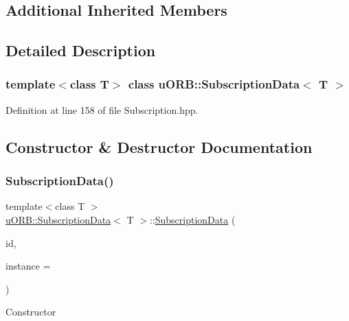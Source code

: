 \subsection*{Additional Inherited Members}


\subsection{Detailed Description}
\subsubsection*{template$<$class T$>$\newline
class u\+O\+R\+B\+::\+Subscription\+Data$<$ T $>$}



Definition at line 158 of file Subscription.\+hpp.



\subsection{Constructor \& Destructor Documentation}
\mbox{\label{classuORB_1_1SubscriptionData_a7d302ca4502cbd67dee434bcbec2d819}} 
\subsubsection{\texorpdfstring{Subscription\+Data()}{SubscriptionData()}\hspace{0.1cm}{\footnotesize\ttfamily [1/2]}}
{\footnotesize\ttfamily template$<$class T $>$ \\
\hyperlink{classuORB_1_1SubscriptionData}{u\+O\+R\+B\+::\+Subscription\+Data}$<$ T $>$\+::\hyperlink{classuORB_1_1SubscriptionData}{Subscription\+Data} (\begin{DoxyParamCaption}\item[{\hyperlink{uORB_8h_a96af5434ec1acdf24287bd7851b0413f}{O\+R\+B\+\_\+\+ID}}]{id,  }\item[{uint8\+\_\+t}]{instance = {} }\end{DoxyParamCaption})\hspace{0.3cm}{\ttfamily [inline]}}

Constructor


